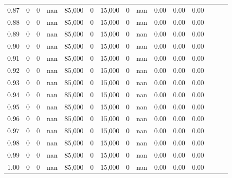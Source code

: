 \begin{tabular}{rrrrrrrrrrrrrrr}
0.87 &      0 &    0 &   nan &  85,000 &       0 &  15,000 &       0 &   nan &  0.00 &  0.00 &      0.00 \\
0.88 &      0 &    0 &   nan &  85,000 &       0 &  15,000 &       0 &   nan &  0.00 &  0.00 &      0.00 \\
0.89 &      0 &    0 &   nan &  85,000 &       0 &  15,000 &       0 &   nan &  0.00 &  0.00 &      0.00 \\
0.90 &      0 &    0 &   nan &  85,000 &       0 &  15,000 &       0 &   nan &  0.00 &  0.00 &      0.00 \\
0.91 &      0 &    0 &   nan &  85,000 &       0 &  15,000 &       0 &   nan &  0.00 &  0.00 &      0.00 \\
0.92 &      0 &    0 &   nan &  85,000 &       0 &  15,000 &       0 &   nan &  0.00 &  0.00 &      0.00 \\
0.93 &      0 &    0 &   nan &  85,000 &       0 &  15,000 &       0 &   nan &  0.00 &  0.00 &      0.00 \\
0.94 &      0 &    0 &   nan &  85,000 &       0 &  15,000 &       0 &   nan &  0.00 &  0.00 &      0.00 \\
0.95 &      0 &    0 &   nan &  85,000 &       0 &  15,000 &       0 &   nan &  0.00 &  0.00 &      0.00 \\
0.96 &      0 &    0 &   nan &  85,000 &       0 &  15,000 &       0 &   nan &  0.00 &  0.00 &      0.00 \\
0.97 &      0 &    0 &   nan &  85,000 &       0 &  15,000 &       0 &   nan &  0.00 &  0.00 &      0.00 \\
0.98 &      0 &    0 &   nan &  85,000 &       0 &  15,000 &       0 &   nan &  0.00 &  0.00 &      0.00 \\
0.99 &      0 &    0 &   nan &  85,000 &       0 &  15,000 &       0 &   nan &  0.00 &  0.00 &      0.00 \\
1.00 &      0 &    0 &   nan &  85,000 &       0 &  15,000 &       0 &   nan &  0.00 &  0.00 &      0.00 \\
\bottomrule
\end{tabular}
